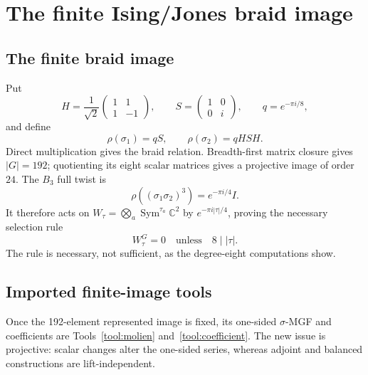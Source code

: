 \documentclass[10pt]{article}
\newcommand{\SMG}{\operatorname{SMG}}
\begin{document}
\section{The finite Ising/Jones braid image}\label{proof:braid-ising}
\begingroup
{}
\providecommand{\Sgm}{\SMG}
\renewcommand{\Sgm}{\SMG}
\setcounter{theorem}{0}
\setcounter{proposition}{0}
\setcounter{lemma}{0}
\setcounter{corollary}{0}
\setcounter{remark}{0}
\begin{abstract}
We test the finite-image formulas on the two-dimensional Ising/Jones braid
representation.  The displayed braid generators close to a 192-element
unitary lift with scalar center of order eight.  We verify its one-sided
sigma--MGF and the full-twist selection rule.  We then pass to conjugation on
$\operatorname{End}(\mathbb C^2)$, obtaining the canonical 24-element
projective image in dimension four, and verify the projective formula there.
\end{abstract}

\subsection{The finite braid image}
Put
\[
 H=\frac1{\sqrt2}\begin{pmatrix}1&1\\1&-1\end{pmatrix},\qquad
 S=\begin{pmatrix}1&0\\0&i\end{pmatrix},\qquad q=e^{-\pi i/8},
\]
and define
\[
 \rho(\sigma_1)=qS,\qquad \rho(\sigma_2)=qHSH.
\]
Direct multiplication gives the braid relation.  Breadth-first matrix closure
gives $|G|=192$; quotienting its eight scalar matrices gives a projective image
of order $24$.  The $B_3$ full twist is
\[
 \rho((\sigma_1\sigma_2)^3)=e^{-\pi i/4}I.
\]
It therefore acts on
$W_\tau=\bigotimes_a\operatorname{Sym}^{\tau_a}\mathbb C^2$ by
$e^{-\pi i|\tau|/4}$, proving the necessary selection rule
\[
 \boxed{W_\tau^G=0\quad\text{unless}\quad8\mid|\tau|.}
\]
The rule is necessary, not sufficient, as the degree-eight computations show.

\subsection{Imported finite-image tools}
Once the 192-element represented image is fixed, its one-sided $\sigma$-MGF
and coefficients are Tools~\ref{tool:molien} and~\ref{tool:coefficient}. The
new issue is projective: scalar changes alter the one-sided series, whereas
adjoint and balanced constructions are lift-independent.
\end{document}
